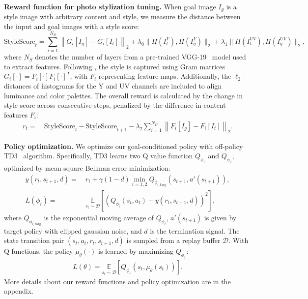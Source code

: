 \documentclass{article}
\newcommand{\taskPST}{photo stylization tuning\xspace}
\begin{document}
\noindent\textbf{Reward function for \taskPST.} 
When goal image $I_g$ is a style image with arbitrary content and style, we measure the distance between the input and goal images with a style score:
\begin{equation}
\label{eq:rew_pst_ss}
\text{StyleScore}_t =  \sum_{i=1}^{N_S} \left\| G_i[I_g] - G_i[I_t] \right\|_{2} + 
\lambda_0 \| H(I_t^Y),  H(I_g^Y) \|_2 + 
\lambda_1 \| H(I_t^{UV}),  H(I_g^{UV}) \|_2,
\end{equation}
where $N_S$ denotes the number of layers from a pre-trained VGG-19~\cite{simonyan2014very-vgg} model used to extract features. 
Following \cite{gatys2016image}, the style is captured using Gram matrices $G_i[\cdot] = F_i[\cdot]F_i[\cdot]^T$, with $F_i$ representing feature maps. Additionally, the $\ell_2$-distances of histograms for the Y and UV channels are included to align luminance and color palettes. The overall reward is calculated by the change in style score across consecutive steps, penalized by the difference in content features $F_i$:
\begin{align}\label{eq:rew_pst}
r_t = & ~ \text{StyleScore}_t - \text{StyleScore}_{t+1} - \lambda_2\sum_{i=1}^{N_C} \left\| F_i[I_g] -F_i[I_t] \right\|_{2}.
\end{align}

\noindent\textbf{Policy optimization. } 
We optimize our goal-conditioned policy with off-policy TD3~\cite{fujimoto2018addressing-td3} algorithm. 
Specifically, TD3 learns two Q value function $Q_{\phi_{1}}$ and $Q_{\phi_{2}}$, optimized by mean square Bellman error minimization:
\begin{align}\label{eq:qloss}
y(r_t, s_{t+1}, d) = & ~ r_t + \gamma (1-d) \min_{i=1,2} Q_{\phi_{i, \text{targ}}}(s_{t+1}, a'(s_{t+1})), \\
L(\phi_{i}) = & ~ \underset{s_t \sim {\mathcal D}}{\mathbb{E}}  \left[ \left( Q_{\phi_i}(s_t,a_t) - y(r_t, s_{t+1}, d) \right)^2\right],
\end{align}
where $Q_{\phi_{i, \text{targ}}}$ is the exponential moving average of $Q_{\phi_{i}}$, $a'(s_{t+1})$ is given by target policy with clipped gaussian noise, and $d$ is the termination signal. The state transition pair $(s_t,a_t,r_t,s_{t+1},d)$ is sampled from a replay buffer $\mathcal{D}$. With Q functions, the policy $\mu_\theta(\cdot)$ is learned by maximizing $Q_{\phi_{1}}$:
\begin{align}
L(\theta) =  \underset{s_t \sim {\mathcal D}}{\mathbb{E}}  \left[ Q_{\phi_1}(s_t,\mu_\theta (s_t)) \right].
\end{align}
More details about our reward functions and policy optimization are in the appendix.
\end{document}

